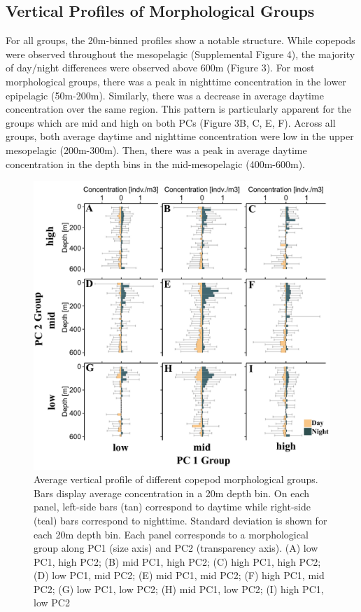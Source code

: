 \documentclass[
]{article}
\begin{document}
\hypertarget{vertical-profiles-of-morphological-groups}{%
\subsection{Vertical Profiles of Morphological
Groups}\label{vertical-profiles-of-morphological-groups}}

For all groups, the 20m-binned profiles show a notable structure. While
copepods were observed throughout the mesopelagic (Supplemental Figure
4), the majority of day/night differences were observed above 600m
(Figure 3). For most morphological groups, there was a peak in nighttime
concentration in the lower epipelagic (50m-200m). Similarly, there was a
decrease in average daytime concentration over the same region. This
pattern is particularly apparent for the groups which are mid and high
on both PCs (Figure 3B, C, E, F). Across all groups, both average
daytime and nighttime concentration were low in the upper mesopelagic
(200m-300m). Then, there was a peak in average daytime concentration in
the depth bins in the mid-mesopelagic (400m-600m).

\begin{figure}

{\centering \includegraphics{../media/figure_03.pdf}

}

\caption{Average vertical profile of different copepod morphological
groups. Bars display average concentration in a 20m depth bin. On each
panel, left-side bars (tan) correspond to daytime while right-side
(teal) bars correspond to nighttime. Standard deviation is shown for
each 20m depth bin. Each panel corresponds to a morphological group
along PC1 (size axis) and PC2 (transparency axis). (A) low PC1, high
PC2; (B) mid PC1, high PC2; (C) high PC1, high PC2; (D) low PC1, mid
PC2; (E) mid PC1, mid PC2; (F) high PC1, mid PC2; (G) low PC1, low PC2;
(H) mid PC1, low PC2; (I) high PC1, low PC2}

\end{figure}
\end{document}
